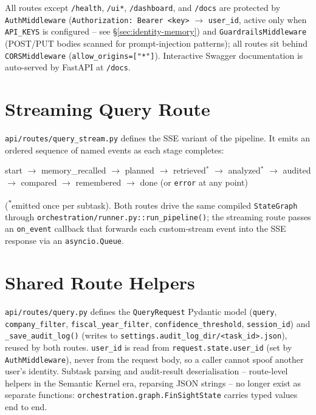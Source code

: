 \documentclass[11pt,a4paper]{report}
\newcommand{\code}[1]{\texttt{#1}}
\newcommand{\file}[1]{\texttt{\small #1}}
\begin{document}
All routes except \code{/health}, \code{/ui*}, \code{/dashboard}, and \code{/docs}
are protected by \code{AuthMiddleware} (\code{Authorization: Bearer <key>} $\to$
\code{user\_id}, active only when \code{API\_KEYS} is configured -- see
\S\ref{sec:identity-memory}) and \code{GuardrailsMiddleware} (POST/PUT bodies
scanned for prompt-injection patterns); all routes sit behind
\code{CORSMiddleware} (\code{allow\_origins=["*"]}). Interactive Swagger
documentation is auto-served by FastAPI at \code{/docs}.

\section{Streaming Query Route}

\file{api/routes/query\_stream.py} defines the SSE variant of the pipeline. It emits an
ordered sequence of named events as each stage completes:

\begin{center}
\ttfamily
start $\to$ memory\_recalled $\to$ planned $\to$ retrieved$^\ast$ $\to$
analyzed$^\ast$ $\to$ audited $\to$ compared $\to$ remembered $\to$ done
\quad(or \texttt{error} at any point)
\end{center}

\noindent(\textsuperscript{$\ast$}emitted once per subtask). Both routes drive
the same compiled \code{StateGraph} through
\file{orchestration/runner.py}\code{::run\_pipeline()}; the streaming route
passes an \code{on\_event} callback that forwards each custom-stream event
into the SSE response via an \code{asyncio.Queue}.

\section{Shared Route Helpers}

\file{api/routes/query.py} defines the \code{QueryRequest} Pydantic model
(\code{query}, \code{company\_filter}, \code{fiscal\_year\_filter},
\code{confidence\_threshold}, \code{session\_id}) and \code{\_save\_audit\_log()}
(writes to \code{settings.audit\_log\_dir/<task\_id>.json}), reused by both
routes. \code{user\_id} is read from \code{request.state.user\_id} (set by
\code{AuthMiddleware}), never from the request body, so a caller cannot spoof
another user's identity. Subtask parsing and audit-result deserialisation --
route-level helpers in the Semantic Kernel era, reparsing JSON strings -- no
longer exist as separate functions: \code{orchestration.graph.FinSightState}
carries typed values end to end.
\end{document}
